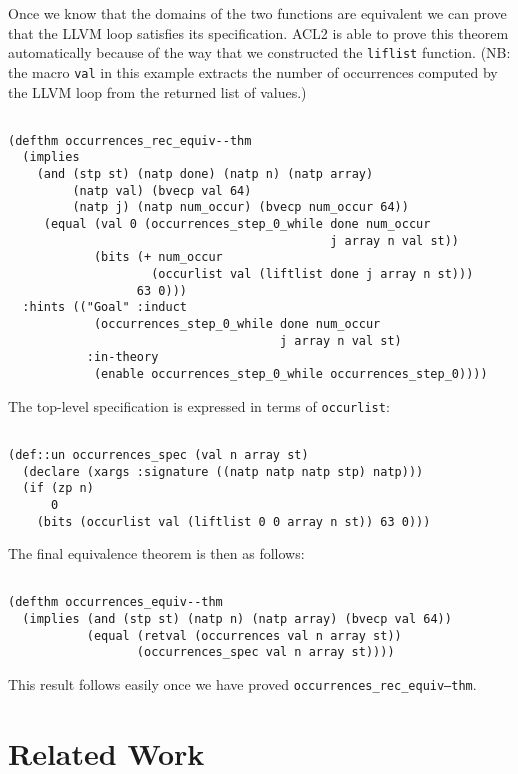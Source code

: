 \documentclass{eptcs}
\begin{document}
Once we know that the domains of the two functions are equivalent we
can prove that the LLVM loop satisfies its specification.    ACL2
is able to prove this theorem automatically because of the way that we 
constructed the \texttt{liflist} function.  (NB: the macro
\texttt{val} in this example extracts the number of occurrences
computed by the LLVM loop from the returned list of values.)

\begin{verbatim}

(defthm occurrences_rec_equiv--thm
  (implies
    (and (stp st) (natp done) (natp n) (natp array)
         (natp val) (bvecp val 64)
         (natp j) (natp num_occur) (bvecp num_occur 64))
     (equal (val 0 (occurrences_step_0_while done num_occur
                                             j array n val st))
            (bits (+ num_occur
                    (occurlist val (liftlist done j array n st)))
                  63 0)))
  :hints (("Goal" :induct
            (occurrences_step_0_while done num_occur
                                      j array n val st)
           :in-theory
            (enable occurrences_step_0_while occurrences_step_0))))

\end{verbatim}

The top-level specification is expressed in terms of \texttt{occurlist}:

\begin{verbatim}

(def::un occurrences_spec (val n array st)
  (declare (xargs :signature ((natp natp natp stp) natp)))
  (if (zp n)
      0
    (bits (occurlist val (liftlist 0 0 array n st)) 63 0)))

\end{verbatim}

The final equivalence theorem is then as follows:

\begin{verbatim}

(defthm occurrences_equiv--thm
  (implies (and (stp st) (natp n) (natp array) (bvecp val 64))
           (equal (retval (occurrences val n array st))
                  (occurrences_spec val n array st))))

\end{verbatim}

This result follows easily once we have proved \texttt{occurrences\_rec\_equiv--thm}.

\section{Related Work}
\end{document}
